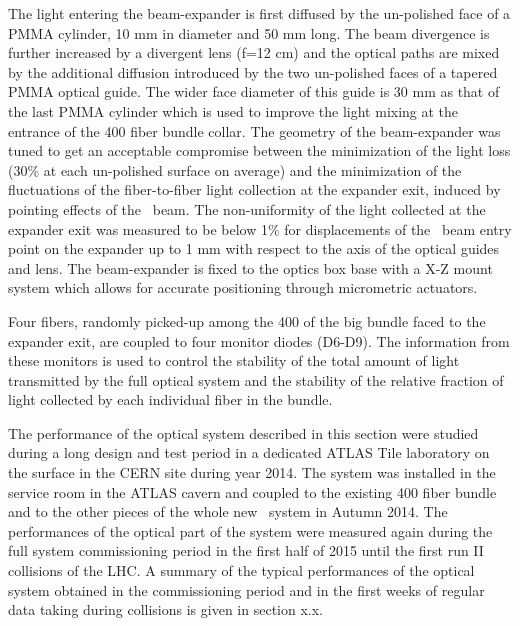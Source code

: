 The light entering the beam-expander is first diffused by the un-polished face of a
PMMA cylinder, 10 mm in diameter and 50 mm long. The beam divergence is further
increased by a divergent lens (f=12 cm) and the optical paths are mixed by the
additional diffusion introduced by the two un-polished faces of a tapered PMMA
optical guide. The wider face diameter of this guide is 30 mm as that of the last
PMMA cylinder which is used to improve the light mixing at
the entrance of the 400 fiber bundle collar. The geometry of the beam-expander was
tuned to get an acceptable compromise between the minimization
of the light loss (30$\%$ at each un-polished surface on average) and the
minimization of the fluctuations of the fiber-to-fiber light collection at the
expander exit, induced by pointing effects of the \laser~beam. The non-uniformity of
the light collected at the expander exit was measured to be below 1$\%$ for
displacements of the \laser~beam entry point on the expander up to 1 mm with respect
to the axis of the optical guides and lens. The beam-expander is fixed to the optics
box base with a X-Z mount system which allows for accurate positioning through
micrometric actuators.

Four fibers, randomly picked-up among the 400 of the big bundle faced to the
expander exit, are coupled to four monitor diodes (D6-D9). The information from
these monitors is used to control the stability of the total amount of light
transmitted by the full optical system and the stability of the relative fraction of
light collected by each individual fiber in the bundle.

The performance of the optical system described in this section were studied during
a long design and test period in a dedicated ATLAS Tile laboratory on the surface in
the CERN site during year 2014. The system was installed in the service room in the
ATLAS cavern and coupled to the existing 400 fiber bundle and to the other pieces of
the whole new \lasii~system in Autumn 2014. The performances of the optical
part of the system were measured again during the full system commissioning period
in the first half of 2015 until the first run II collisions of the LHC. A summary of
the typical performances of the optical system obtained in the commissioning period
and in the first weeks of regular data taking during collisions is given in section
x.x.  

